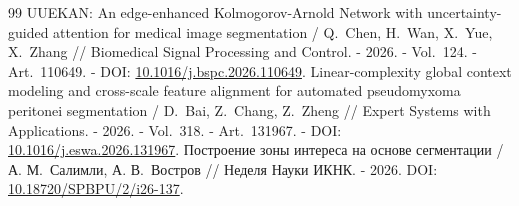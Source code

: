 \documentclass[areasetadvanced]{scrartcl}
\begin{document}
\begin{thebibliography}{99}
	 UUEKAN: An edge-enhanced Kolmogorov-Arnold Network with uncertainty-guided attention for medical image segmentation / Q.~Chen, H.~Wan, X.~Yue, X.~Zhang // Biomedical Signal Processing and Control. - 2026. - Vol.~124. - Art.~110649. - DOI: \href{https://doi.org/10.1016/j.bspc.2026.110649}{10.1016/j.bspc.2026.110649}.
	 Linear-complexity global context modeling and cross-scale feature alignment for automated pseudomyxoma peritonei segmentation / D.~Bai, Z.~Chang, Z.~Zheng // Expert Systems with Applications. - 2026. - Vol.~318. - Art.~131967. - DOI: \href{https://doi.org/10.1016/j.eswa.2026.131967}{10.1016/j.eswa.2026.131967}.
	 Построение зоны интереса на основе сегментации / А. М.~Салимли, А. В.~Востров // Неделя Науки ИКНК. - 2026. DOI: \href{https://doi.org/10.18720/SPBPU/2/i26-137}{10.18720/SPBPU/2/i26-137}.
\end{thebibliography}


\clearpage
\pdfpagewidth=420mm
\pdfpageheight=297mm
\setlength{\paperwidth}{420mm}
\setlength{\paperheight}{297mm}
\setlength{\textwidth}{390mm}
\setlength{\textheight}{267mm}
\setlength{\oddsidemargin}{-1in}\addtolength{\oddsidemargin}{15mm}
\setlength{\evensidemargin}{\oddsidemargin}
\setlength{\topmargin}{-1in}\addtolength{\topmargin}{15mm}
\setlength{\headheight}{0pt}
\setlength{\headsep}{0pt}
{}

\end{document}
